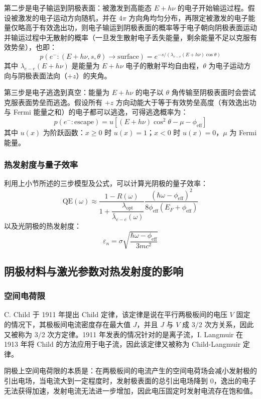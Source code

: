 第二步是电子输运到阴极表面：被激发到高能态 $E+h\nu$ 的电子开始输运过程。假设被激发的电子运动方向随机，并在 $4\pi$ 方向角均匀分布，再限定被激发的电子能量仅略高于有效逸出功，则电子输运到阴极表面的概率等于电子朝向阴极表面运动并输运过程中无散射的概率（一旦发生散射电子丢失能量，剩余能量不足以克服有效势垒），也即：
	\[
	p(e^{-}: (E+h\nu, s, \theta) \to \mathrm{surface}) = e^{-s/(\lambda_{e-e}(E+h\nu)\cos\theta)}
	\]
	其中 $\lambda_{e-e}(E+h\nu)$ 是能量为 $E+h\nu$ 电子的散射平均自由程，$\theta$ 为电子运动方向与阴极表面法向（$+z$）的夹角。
	
第三步是电子逃逸到真空：能量为 $E+h\nu$ 的电子以 $\theta$ 角传输至阴极表面时会尝试克服表面势垒而逃逸。假设所有 $+z$ 方向动能大于等于有效势垒高度（有效逸出功与 Fermi 能量之和）的电子都可以逃逸，可得逃逸概率为：
	\[
	p(e^{-}: \mathrm{escape}) = u[(E+h\nu)\cos^2\theta-\mu-\phi_{\mathrm{eff}}]
	\]
	其中 $u(x)$ 为阶跃函数：$x\ge 0$ 时 $u(x)=1$；$x<0$ 时 $u(x)=0$，$\mu$ 为 Fermi 能量。

\subsubsection{热发射度与量子效率}
利用上小节所述的三步模型及公式，可以计算光阴极的量子效率：
\begin{equation}
	\mathrm{QE}(\omega) \approx\dfrac{1-R(\omega)}{1+\dfrac{\lambda_{\mathrm{opt}}}{\bar{\lambda}_{e-e}(\omega)}}\frac{(\hbar\omega-\phi_{\mathrm{eff}})^2}{8\phi_{\mathrm{eff}}(E_F+\phi_{\mathrm{eff}})}
\end{equation}
以及光阴极的热发射度：
\begin{equation}
	\varepsilon_{n} =\sigma\sqrt{\dfrac{\hbar\omega-\phi_{\mathrm{eff}}}{3mc^2}}
	\label{eq:emit-dowell}
\end{equation}

\subsection{阴极材料与激光参数对热发射度的影响}
\subsubsection{空间电荷限}
	C. Child 于 1911 年提出 Child 定律，该定律是说在平行两极板间的电压 $V$ 固定的情况下，其极板间电流密度存在最大值 $J$，并且 $J$ 与 $V$ 成 3/2 次方关系，因此又被称为 3/2 次方定律。1911 年发表的情况针对的是离子流，I. Langmuir 在 1913 年将 Child 的方法应用于电子流，因此该定律又被称为 Child-Langmuir 定律。

	阴极上空间电荷限的本质是：在两极板间的电流产生的空间电荷场会减小发射极的引出电场，当电流大到一定程度时，发射极表面的总引出电场降到 0，逸出的电子无法获得加速，发射电流无法进一步增加，因此电压固定时发射电流存在饱和值。
	
